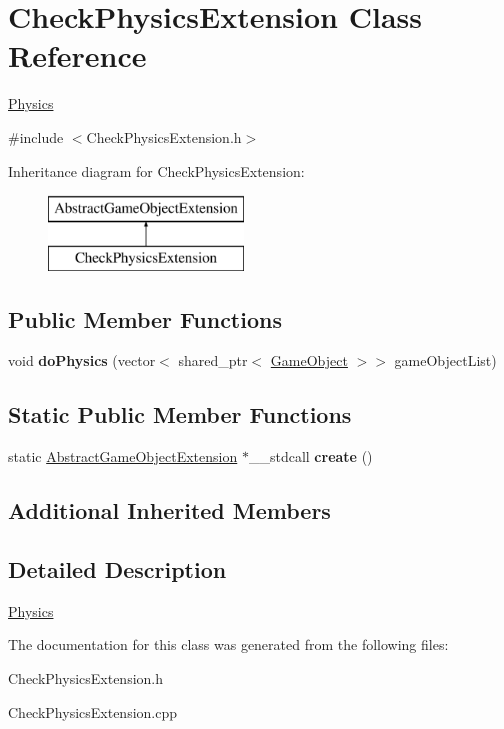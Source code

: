 \hypertarget{class_check_physics_extension}{}\section{Check\+Physics\+Extension Class Reference}
\label{class_check_physics_extension}


\mbox{\hyperlink{class_physics}{Physics}}  




{\ttfamily \#include $<$Check\+Physics\+Extension.\+h$>$}

Inheritance diagram for Check\+Physics\+Extension\+:\begin{figure}[H]
\begin{center}
\leavevmode
\includegraphics[height=2.000000cm]{class_check_physics_extension}
\end{center}
\end{figure}
\subsection*{Public Member Functions}
\begin{DoxyCompactItemize}
\item 
\mbox{\label{class_check_physics_extension_a8a830590dbc7f53e3a785a630b6e285c}} 
void {\bfseries do\+Physics} (vector$<$ shared\+\_\+ptr$<$ \mbox{\hyperlink{class_game_object}{Game\+Object}} $>$$>$ game\+Object\+List)
\end{DoxyCompactItemize}
\subsection*{Static Public Member Functions}
\begin{DoxyCompactItemize}
\item 
\mbox{\label{class_check_physics_extension_a09d2a0a0e848825c71f044350058530e}} 
static \mbox{\hyperlink{class_abstract_game_object_extension}{Abstract\+Game\+Object\+Extension}} $\ast$\+\_\+\+\_\+stdcall {\bfseries create} ()
\end{DoxyCompactItemize}
\subsection*{Additional Inherited Members}


\subsection{Detailed Description}
\mbox{\hyperlink{class_physics}{Physics}} 



The documentation for this class was generated from the following files\+:\begin{DoxyCompactItemize}
\item 
Check\+Physics\+Extension.\+h\item 
Check\+Physics\+Extension.\+cpp\end{DoxyCompactItemize}
